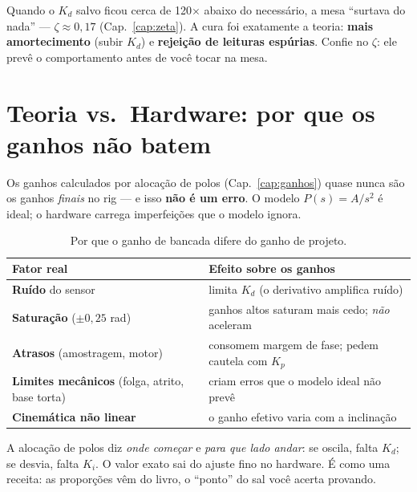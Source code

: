 \begin{atencao}
Quando o $K_d$ salvo ficou cerca de 120$\times$ abaixo do necess\'ario, a mesa
``surtava do nada'' --- $\zeta\!\approx\!0{,}17$ (Cap.~\ref{cap:zeta}). A cura foi exatamente a
teoria: \textbf{mais amortecimento} (subir $K_d$) e \textbf{rejei\c{c}\~ao de
leituras esp\'urias}. Confie no $\zeta$: ele prev\^e o comportamento antes de voc\^e
tocar na mesa.
\end{atencao}

\section{Teoria vs.\ Hardware: por que os ganhos n\~ao batem}
Os ganhos calculados por aloca\c{c}\~ao de polos (Cap.~\ref{cap:ganhos}) quase nunca
s\~ao os ganhos \emph{finais} no rig --- e isso \textbf{n\~ao \'e um erro}. O modelo
$P(s)=A/s^2$ \'e ideal; o hardware carrega imperfei\c{c}\~oes que o modelo ignora.

\begin{table}[h]\centering
\caption{Por que o ganho de bancada difere do ganho de projeto.}
\label{tab:tvh}
\small
\begin{tabularx}{\textwidth}{l X}
\toprule
Fator real & Efeito sobre os ganhos \\
\midrule
\textbf{Ru\'ido} do sensor & limita $K_d$ (o derivativo amplifica ru\'ido) \\
\textbf{Satura\c{c}\~ao} ($\pm0{,}25$ rad) & ganhos altos saturam mais cedo; \emph{n\~ao} aceleram \\
\textbf{Atrasos} (amostragem, motor) & consomem margem de fase; pedem cautela com $K_p$ \\
\textbf{Limites mec\^anicos} (folga, atrito, base torta) & criam erros que o modelo ideal n\~ao prev\^e \\
\textbf{Cinem\'atica n\~ao linear} & o ganho efetivo varia com a inclina\c{c}\~ao \\
\bottomrule
\end{tabularx}
\end{table}

\begin{intuicao}
A aloca\c{c}\~ao de polos diz \emph{onde come\c{c}ar} e \emph{para que lado andar}:
se oscila, falta $K_d$; se desvia, falta $K_i$. O valor exato sai do ajuste fino no
hardware. \'E como uma receita: as propor\c{c}\~oes v\^em do livro, o ``ponto'' do
sal voc\^e acerta provando.
\end{intuicao}


